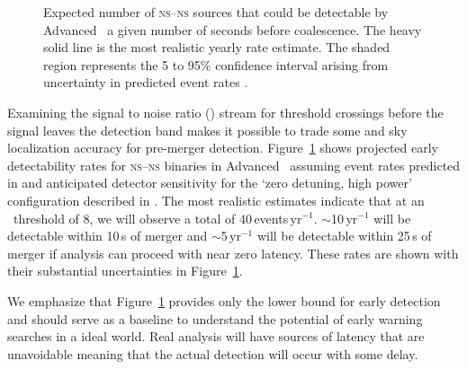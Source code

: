 \begin{figure}[h]
\caption{\label{fig:earlywarning}Expected number of \textsc{ns}--\textsc{ns}
sources that could be detectable by Advanced \LIGO\ a given number of seconds
before coalescence.  The heavy solid line is the most realistic yearly rate
estimate.  The shaded region represents the 5 to 95\% confidence interval
arising from uncertainty in predicted event rates \citep{Abadie:2010p10836}.}
\end{figure}
%
Examining the signal to noise ratio (\SNR{}) stream for threshold crossings
before the \GW{} signal leaves the detection band makes it possible to trade
some \SNR{} and sky localization accuracy for pre-merger detection.
Figure~\ref{fig:earlywarning} shows projected early detectability rates for
\textsc{ns}--\textsc{ns} binaries in Advanced \LIGO\ assuming event rates
predicted in \citet{Abadie:2010p10836} and anticipated detector sensitivity for
the `zero detuning, high power' configuration described in \citet{ALIGONoise}.
The most realistic estimates indicate that at an \SNR\ threshold of 8, we will
observe a total of 40\,events\,yr$^{-1}$. $\sim$10\,yr$^{-1}$ will be detectable
within 10\,s of merger and $\sim$5\,yr$^{-1}$ will be detectable within 25\,s of
merger if analysis can proceed with near zero latency. These rates are shown
with their substantial uncertainties in Figure~\ref{fig:earlywarning}.

We emphasize that Figure~\ref{fig:earlywarning} provides only the lower bound
for early detection and should serve as a baseline to understand the potential
of early warning \GW{} searches in a ideal world.  Real analysis will have
sources of latency that are unavoidable meaning that the actual detection will
occur with some delay. 


